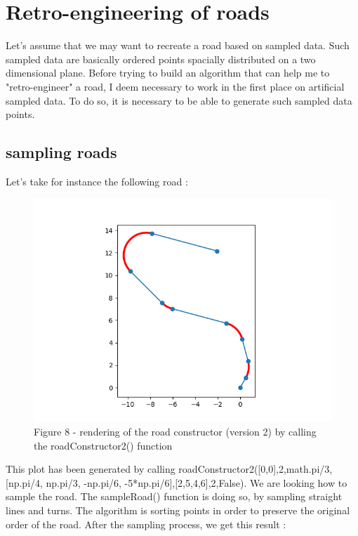 \documentclass[a4paper,12pt,fleqn]{article}
\begin{document}
 


\section{Retro-engineering of roads}

Let's assume that we may want to recreate a road based on sampled data. Such sampled data are basically ordered points spacially distributed on a two dimensional plane. Before trying to build an algorithm that can help me to "retro-engineer" a road, I deem necessary to work in the first place on artificial sampled data. To do so, it is necessary to be able to generate such sampled data points.

\subsection{sampling roads}

Let's take for instance the following road :

\begin{figure}[H]
\centering
\includegraphics[width=\textwidth]{sampledRoadRoad}
Figure 8 - rendering of the road constructor (version 2) by calling the roadConstructor2() function
\end{figure}

This plot has been generated by calling roadConstructor2([0,0],2,math.pi/3,[np.pi/4, np.pi/3, -np.pi/6, -5*np.pi/6],[2,5,4,6],2,False). We are looking how to sample the road. The sampleRoad() function is doing so, by sampling straight lines and turns. The algorithm is sorting points in order to preserve the original order of the road.  After the sampling process, we get this result : 
\end{document}
